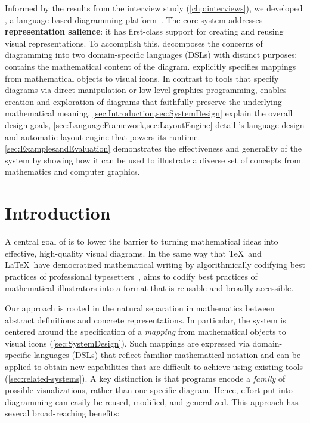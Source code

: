 Informed by the results from the interview study (\cref{chp:interviews}), we developed \Penrose, a language-based diagramming platform~\cite{penrose}. The core \Penrose system addresses \textbf{representation salience}: it has first-class support for creating and reusing visual representations. To accomplish this, \Penrose decomposes the concerns of diagramming into two domain-specific languages (DSLs) with distinct purposes: \Substance contains the mathematical content of the diagram. \Style explicitly specifies mappings from mathematical objects to visual icons. In contrast to tools that specify diagrams via direct manipulation or low-level graphics programming, \Penrose{} enables creation and exploration of diagrams that faithfully preserve the underlying mathematical meaning. \cref{sec:Introduction,sec:SystemDesign} explain the overall design goals, \cref{sec:LanguageFramework,sec:LayoutEngine} detail \Penrose{}'s language design and automatic layout engine that powers its runtime. \cref{sec:ExamplesandEvaluation} demonstrates the effectiveness and generality of the system by showing how it can be used to illustrate a diverse set of concepts from mathematics and computer graphics.

\section{Introduction}
\label{sec:Introduction}

A central goal of \Penrose{} is to lower the barrier to turning mathematical ideas into effective, high-quality visual diagrams.  In the same way that \TeX\ and \LaTeX\ have democratized mathematical writing by algorithmically codifying best practices of professional typesetters~\cite{Beeton:2016:CMT}, \Penrose{} aims to codify best practices of mathematical illustrators into a format that is reusable and broadly accessible.

Our approach is rooted in the natural separation in mathematics between abstract definitions and concrete representations. In particular, the \Penrose{} system is centered around the specification of a \emph{mapping} from mathematical objects to visual icons (\cref{sec:SystemDesign}).  Such mappings are expressed via domain-specific languages (DSLs) that reflect familiar mathematical notation and can be applied to obtain new capabilities that are difficult to achieve using existing tools (\cref{sec:related-systems}).  A key distinction is that \Penrose{} programs encode a \emph{family} of possible visualizations, rather than one specific diagram.  Hence, effort put into diagramming can easily be reused, modified, and generalized.  This approach has several broad-reaching benefits:

